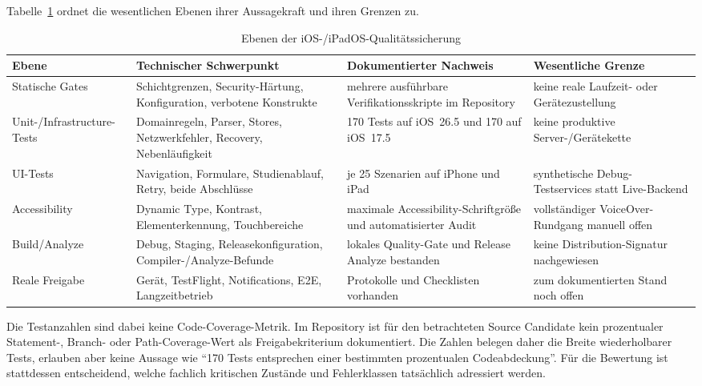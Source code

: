 \begin{neu}
Tabelle~\ref{tab:ios-quality-assurance-layers} ordnet die wesentlichen Ebenen ihrer Aussagekraft und ihren Grenzen zu.

\begin{table}[htbp]
\centering
\caption{Ebenen der iOS-/iPadOS-Qualitätssicherung}
\label{tab:ios-quality-assurance-layers}
\begin{tabular}{p{}p{}p{}p{}}
\textbf{Ebene} & \textbf{Technischer Schwerpunkt} & \textbf{Dokumentierter Nachweis} & \textbf{Wesentliche Grenze} \\
\hline
Statische Gates & Schichtgrenzen, Security-Härtung, Konfiguration, verbotene Konstrukte & mehrere ausführbare Verifikationsskripte im Repository & keine reale Laufzeit- oder Gerätezustellung \\
Unit-/Infrastructure-Tests & Domainregeln, Parser, Stores, Netzwerkfehler, Recovery, Nebenläufigkeit & 170 Tests auf iOS~26.5 und 170 auf iOS~17.5 & keine produktive Server-/Gerätekette \\
UI-Tests & Navigation, Formulare, Studienablauf, Retry, beide Abschlüsse & je 25 Szenarien auf iPhone und iPad & synthetische Debug-Testservices statt Live-Backend \\
Accessibility & Dynamic Type, Kontrast, Elementerkennung, Touchbereiche & maximale Accessibility-Schriftgröße und automatisierter Audit & vollständiger VoiceOver-Rundgang manuell offen \\
Build/Analyze & Debug, Staging, Releasekonfiguration, Compiler-/Analyze-Befunde & lokales Quality-Gate und Release Analyze bestanden & keine Distribution-Signatur nachgewiesen \\
Reale Freigabe & Gerät, TestFlight, Notifications, E2E, Langzeitbetrieb & Protokolle und Checklisten vorhanden & zum dokumentierten Stand noch offen \\
\end{tabular}
\end{table}

Die Testanzahlen sind dabei keine Code-Coverage-Metrik. Im Repository ist für den betrachteten Source Candidate kein prozentualer Statement-, Branch- oder Path-Coverage-Wert als Freigabekriterium dokumentiert. Die Zahlen belegen daher die Breite wiederholbarer Tests, erlauben aber keine Aussage wie \enquote{170 Tests entsprechen einer bestimmten prozentualen Codeabdeckung}. Für die Bewertung ist stattdessen entscheidend, welche fachlich kritischen Zustände und Fehlerklassen tatsächlich adressiert werden.


\end{neu}
